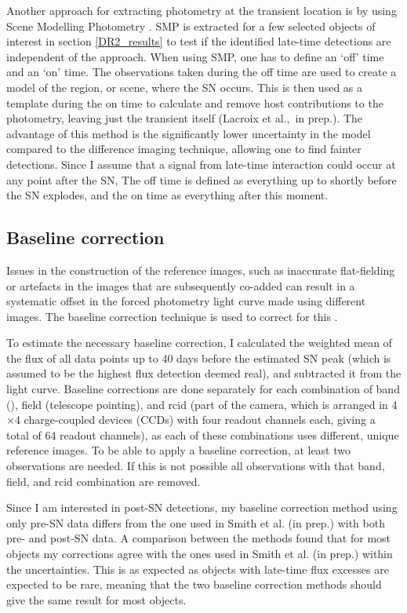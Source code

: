 \documentclass[a4paper,oneside,12pt, class=Latex/Classes/PhDthesisPSnPDF, crop=false]{standalone}
\begin{document}
Another approach for extracting photometry at the transient location is by using Scene Modelling Photometry \citep[SMP;][]{Holtzmann_SMP}. SMP is extracted for a few selected objects of interest in section \ref{DR2_results} to test if the identified late-time detections are independent of the approach. When using SMP, one has to define an `off' time and an `on' time. The observations taken during the off time are used to create a model of the region, or scene, where the SN occurs. This is then used as a template during the on time to calculate and remove host contributions to the photometry, leaving just the transient itself (Lacroix et al.,~in prep.). The advantage of this method is the significantly lower uncertainty in the model compared to the difference imaging technique, allowing one to find fainter detections. Since I assume that a signal from late-time interaction could occur at any point after the SN, The off time is defined as everything up to shortly before the SN explodes, and the on time as everything after this moment.


\subsection{Baseline correction}
Issues in the construction of the reference images, such as inaccurate flat-fielding or artefacts in the images that are subsequently co-added can result in a systematic offset in the forced photometry light curve made using different images. The baseline correction technique is used to correct for this \citep{Yao_baseline_corr, Miller_baseline_corr}.

To estimate the necessary baseline correction, I calculated the weighted mean of the flux of all data points up to 40 days before the estimated SN peak (which is assumed to be the highest flux detection deemed real), and subtracted it from the light curve. Baseline corrections are done separately for each combination of band (\ztfg\ztfr\ztfi), field (telescope pointing), and rcid (part of the camera, which is arranged in 4$\times$4 charge-coupled devices (CCDs) with four readout channels each, giving a total of 64 readout channels), as each of these combinations uses different, unique reference images. To be able to apply a baseline correction, at least two observations are needed. If this is not possible all observations with that band, field, and rcid combination are removed.

Since I am interested in post-SN detections, my baseline correction method using only pre-SN data differs from the one used in Smith et al. (in prep.) with both pre- and post-SN data. A comparison between the methods found that for most objects my corrections agree with the ones used in Smith et al. (in prep.) within the uncertainties. This is as expected as objects with late-time flux excesses are expected to be rare, meaning that the two baseline correction methods should give the same result for most objects.
\end{document}
